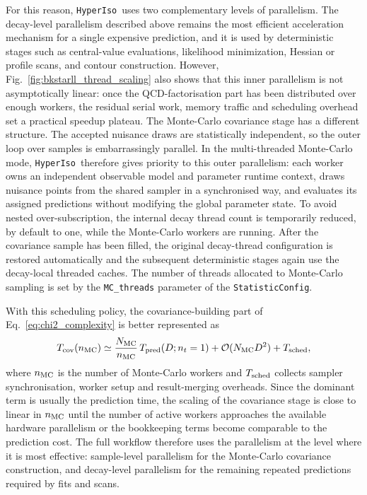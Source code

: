 \documentclass[preprint,11pt]{elsarticle}
\newcommand{\hi}{\texttt{HyperIso}}
\begin{document}
For this reason, \hi~uses two complementary levels of parallelism.  The decay-level parallelism described above remains the most efficient acceleration mechanism for a single expensive prediction, and it is used by deterministic stages such as central-value evaluations, likelihood minimization, Hessian or profile scans, and contour construction.  However, Fig.~\ref{fig:bkstarll_thread_scaling} also shows that this inner parallelism is not asymptotically linear: once the QCD-factorisation part has been distributed over enough workers, the residual serial work, memory traffic and scheduling overhead set a practical speedup plateau.  The Monte-Carlo covariance stage has a different structure.  The accepted nuisance draws are statistically independent, so the outer loop over samples is embarrassingly parallel.  In the multi-threaded Monte-Carlo mode, \hi~therefore gives priority to this outer parallelism: each worker owns an independent observable model and parameter runtime context, draws nuisance points from the shared sampler in a synchronised way, and evaluates its assigned predictions without modifying the global parameter state.  To avoid nested over-subscription, the internal decay thread count is temporarily reduced, by default to one, while the Monte-Carlo workers are running.  After the covariance sample has been filled, the original decay-thread configuration is restored automatically and the subsequent deterministic stages again use the decay-local threaded caches. The number of threads allocated to Monte-Carlo sampling is set by the \texttt{MC\_threads} parameter of the \texttt{StatisticConfig}.

With this scheduling policy, the covariance-building part of Eq.~\eqref{eq:chi2_complexity} is better represented as
\begin{equation}
    T_{\rm cov}(n_{\rm MC})
    \simeq
    \frac{N_{\rm MC}}{n_{\rm MC}}\,
    T_{\rm pred}(D; n_t=1)
    +\mathcal{O}(N_{\rm MC}D^2)
    +T_{\rm sched},
    \label{eq:mc_parallel_covariance}
\end{equation}
where $n_{\rm MC}$ is the number of Monte-Carlo workers and $T_{\rm sched}$ collects sampler synchronisation, worker setup and result-merging overheads.  Since the dominant term is usually the prediction time, the scaling of the covariance stage is close to linear in $n_{\rm MC}$ until the number of active workers approaches the available hardware parallelism or the bookkeeping terms become comparable to the prediction cost.  The full workflow therefore uses the parallelism at the level where it is most effective: sample-level parallelism for the Monte-Carlo covariance construction, and decay-level parallelism for the remaining repeated predictions required by fits and scans.
\end{document}

